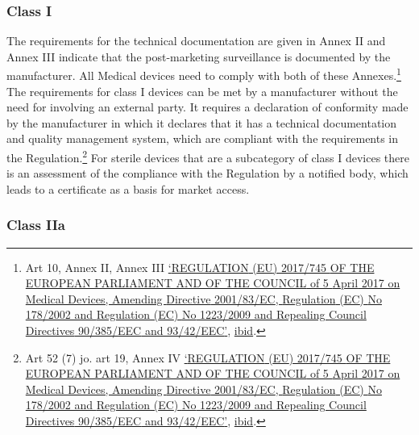 \documentclass[
]{scrartcl}
\begin{document}
\hypertarget{class-i}{%
\subsubsection{Class I}\label{class-i}}

The requirements for the technical documentation are given in Annex II and Annex III indicate that the post-marketing surveillance is documented by the manufacturer. All Medical devices need to comply with both of these Annexes.\footnote{Art 10, Annex II, Annex III \protect\hyperlink{ref-REGULATIONEU2017a}{{`{REGULATION} ({EU}) 2017/745 {OF THE EUROPEAN PARLIAMENT AND OF THE COUNCIL} of 5 {April} 2017 on Medical Devices, Amending {Directive} 2001/83/{EC}, {Regulation} ({EC}) {No} 178/2002 and {Regulation} ({EC}) {No} 1223/2009 and Repealing {Council Directives} 90/385/{EEC} and 93/42/{EEC}'}}, \protect\hyperlink{ref-REGULATIONEU2017a}{ibid}.} The requirements for class I devices can be met by a manufacturer without the need for involving an external party. It requires a declaration of conformity made by the manufacturer in which it declares that it has a technical documentation and quality management system, which are compliant with the requirements in the Regulation.\footnote{Art 52 (7) jo. art 19, Annex IV \protect\hyperlink{ref-REGULATIONEU2017a}{{`{REGULATION} ({EU}) 2017/745 {OF THE EUROPEAN PARLIAMENT AND OF THE COUNCIL} of 5 {April} 2017 on Medical Devices, Amending {Directive} 2001/83/{EC}, {Regulation} ({EC}) {No} 178/2002 and {Regulation} ({EC}) {No} 1223/2009 and Repealing {Council Directives} 90/385/{EEC} and 93/42/{EEC}'}}, \protect\hyperlink{ref-REGULATIONEU2017a}{ibid}.} For sterile devices that are a subcategory of class I devices there is an assessment of the compliance with the Regulation by a notified body, which leads to a certificate as a basis for market access.

\hypertarget{class-iia}{%
\subsubsection{Class IIa}\label{class-iia}}
\end{document}
